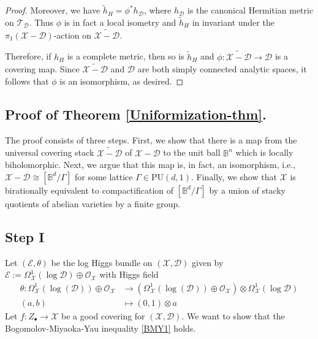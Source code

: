 \documentclass[a4paper]{amsart}
\theoremstyle{definition}
\begin{document}
\begin{proof}
Moreover, we have $\widetilde{h}_H=\phi^*h_\mathcal{D}$, where $h_{\mathcal{D}}$ is the canonical Hermitian metric on $\mathcal{T}_{\mathcal{D}}$. Thus $\phi$ is in fact a local isometry and $\widetilde{h}_H$ in invariant under the $\pi_1(\mathscr{X}-\mathscr{D})$-action on $\widetilde{\mathscr{X}-\mathscr{D}}$.

Therefore, if $h_H$ is a complete metric, then so is $\widetilde{h}_H$ and $\phi:\widetilde{\mathscr{X}-\mathscr{D}}\to\mathcal{D}$ is a covering map. Since $\widetilde{\mathscr{X}-\mathscr{D}}$ and $\mathcal{D}$ are both simply connected analytic spaces, it follows that $\phi$ is an isomorphism, as desired. 
\end{proof}

\subsection{Proof of Theorem \ref{Uniformization-thm}.}
The proof consists of three steps. First, we show that there is a map from the universal covering stack $\widetilde{\mathscr{X}-\mathscr{D}}$ of $\mathscr{X}-\mathscr{D}$ to the unit ball $\mathbb{B}^n$ which is locally biholomorphic. Next, we argue that this map is, in fact, an isomorphism, i.e., $\mathscr{X}-\mathscr{D}\cong[\mathbb{B}^d/\Gamma]$ for some lattice $\Gamma\in\mathrm{PU}(d,1)$. Finally, we show that $\mathscr{X}$ is birationally equivalent to compactification of $[\mathbb{B}^d/\Gamma]$ by a union of stacky quotients of abelian varieties by a finite group.

\subsection*{Step I} Let $(\mathcal{E},\theta)$ be the log Higgs bundle on $(\mathscr{X},\mathscr{D})$ given by $\mathcal{E}:=\Omega^1_{\mathscr{X}}(\log \mathscr{D})\oplus\mathcal{O}_\mathscr{X}$ with Higgs field
\begin{align*}
\theta:\Omega^1_{\mathscr{X}}(\log(\mathscr{D}))\oplus\mathcal{O}_{\mathscr{X}}&\to(\Omega^1_{\mathscr{X}}(\log(\mathscr{D}))\oplus\mathcal{O}_{\mathscr{X}})\otimes\Omega^1_{\mathscr{X}}(\log \mathscr{D})\\
(a,b)&\mapsto(0,1)\otimes a
\end{align*}
Let $f:Z_\bullet\to \mathscr{X}$ be a good covering for $(\mathscr{X},\mathscr{D})$. We want to show that the Bogomolov-Miyaoka-Yau inequality \ref{BMY1} holds.
\end{document}
